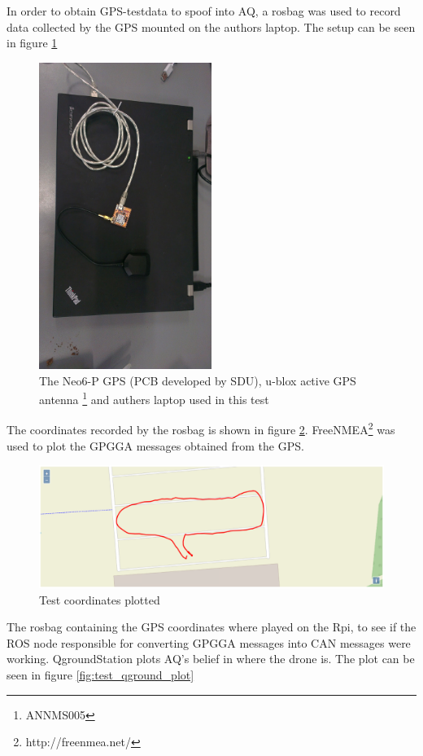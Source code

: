 In order to obtain GPS-testdata to spoof into AQ, a rosbag was used to record data collected by the GPS mounted on the authors laptop. The setup can be seen in figure \ref{fig:test_laptop_and_gps} 
\begin{figure}[H]
    \center
    \includegraphics[width=0.5\textwidth, angle=90]{graphics/test_laptop.jpg}
  \caption[Comment]{The Neo6-P GPS (PCB developed by SDU), u-blox active GPS antenna \protect\footnote{ANNMS005} and authers laptop used in this test}   \label{fig:test_laptop_and_gps}
\end{figure}
The coordinates recorded by the rosbag is shown in figure \ref{fig:gps_raw_plot}. 
FreeNMEA\footnote{http://freenmea.net/} was used to plot the GPGGA messages obtained from the GPS.
\begin{figure}[H]
    \center
    \includegraphics[width=1\textwidth]{graphics/gps_test_gps_plot}
  \caption{Test coordinates plotted}  \label{fig:gps_raw_plot}
\end{figure}
The rosbag containing the GPS coordinates where played on the Rpi, to see if the ROS node responsible for converting GPGGA messages into CAN messages were working. QgroundStation plots AQ's belief in where the drone is. The plot can be seen in figure \ref{fig:test_qground_plot}

